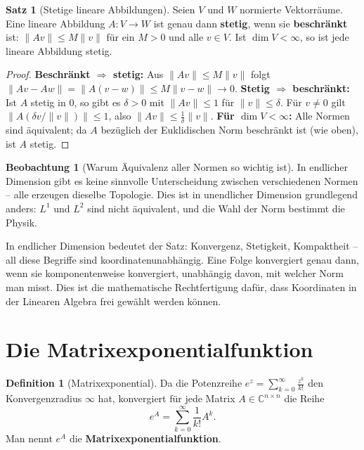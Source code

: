 ﻿\documentclass[a4paper,12pt]{report}
\theoremstyle{definition}
\newtheorem{definition}{Definition}
\newtheorem{satz}{Satz}
\newtheorem{beobachtung}{Beobachtung}
\begin{document}
\begin{satz}[Stetige lineare Abbildungen]
    Seien $V$ und $W$ normierte Vektorräume. Eine lineare Abbildung
    $A : V \to W$ ist genau dann \textbf{stetig}, wenn sie
    \textbf{beschränkt} ist: $\|Av\| \leq M\|v\|$ für ein $M > 0$
    und alle $v \in V$. Ist $\dim V < \infty$, so ist jede lineare
    Abbildung stetig.
\end{satz}
\begin{proof}
    \textbf{Beschränkt $\Rightarrow$ stetig:} Aus $\|Av\| \leq M\|v\|$ folgt
    $\|Av - Aw\| = \|A(v-w)\| \leq M\|v-w\| \to 0$.
    \textbf{Stetig $\Rightarrow$ beschränkt:} Ist $A$ stetig in $0$, so gibt es
    $\delta > 0$ mit $\|Av\| \leq 1$ für $\|v\| \leq \delta$.
    Für $v \neq 0$ gilt $\|A(\delta v / \|v\|)\| \leq 1$, also $\|Av\| \leq \frac{1}{\delta}\|v\|$.
    \textbf{Für $\dim V < \infty$:} Alle Normen sind äquivalent; da $A$ bezüglich
    der Euklidischen Norm beschränkt ist (wie oben), ist $A$ stetig.
\end{proof}


\begin{beobachtung}[Warum Äquivalenz aller Normen so wichtig ist]
    In endlicher Dimension gibt es keine sinnvolle Unterscheidung zwischen
    verschiedenen Normen -- alle erzeugen dieselbe Topologie. Dies ist
    in unendlicher Dimension grundlegend anders: $L^1$ und $L^2$ sind
    nicht äquivalent, und die Wahl der Norm bestimmt die Physik.

    In endlicher Dimension bedeutet der Satz: Konvergenz, Stetigkeit,
    Kompaktheit -- all diese Begriffe sind koordinatenunabhängig.
    Eine Folge konvergiert genau dann, wenn sie komponentenweise konvergiert,
    unabhängig davon, mit welcher Norm man misst. Dies ist die
    mathematische Rechtfertigung dafür, dass Koordinaten in der
    Linearen Algebra frei gewählt werden können.
\end{beobachtung}

\section{Die Matrixexponentialfunktion}

\begin{definition}[Matrixexponential]
    Da die Potenzreihe $e^z = \sum_{k=0}^\infty \frac{z^k}{k!}$ den
    Konvergenzradius $\infty$ hat, konvergiert für jede Matrix
    $A \in \mathbb{C}^{n \times n}$ die Reihe
    \[
        e^A = \sum_{k=0}^\infty \frac{1}{k!} A^k.
    \]
    Man nennt $e^A$ die \textbf{Matrixexponentialfunktion}.
\end{definition}
\end{document}
